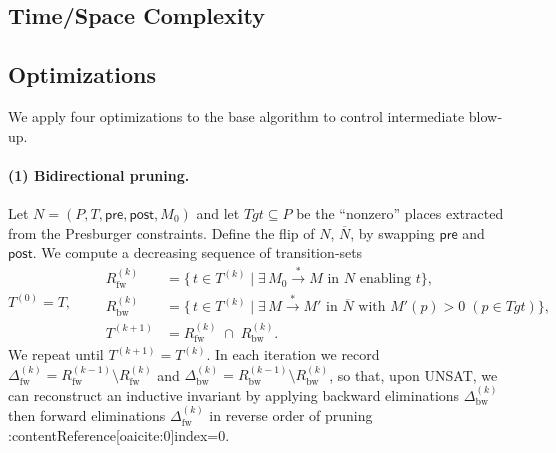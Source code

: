 %


\subsection{Time/Space Complexity}



\subsection{Optimizations}
\label{sec:optimizations}


We apply four optimizations to the base algorithm to control intermediate blow‐up.

\paragraph{(1) Bidirectional pruning.}  
Let \(N=(P,T,\mathsf{pre},\mathsf{post},M_0)\) and let \(\mathit{Tgt}\subseteq P\) be the “nonzero” places extracted from the Presburger constraints.  Define the flip of \(N\), \(\overline N\), by swapping \(\mathsf{pre}\) and \(\mathsf{post}\).  We compute a decreasing sequence of transition‐sets
\[
T^{(0)} = T,\qquad
\begin{aligned}
	R_{\mathrm{fw}}^{(k)} &= \{\,t\in T^{(k)} \mid \exists\,M_0\xrightarrow{*}M\text{ in }N\text{ enabling }t\},\\
	R_{\mathrm{bw}}^{(k)} &= \{\,t\in T^{(k)} \mid \exists\,M\xrightarrow{*}M'\text{ in }\overline N\text{ with }M'(p)>0\;(p\in\mathit{Tgt})\},\\
	T^{(k+1)} &= R_{\mathrm{fw}}^{(k)} \;\cap\; R_{\mathrm{bw}}^{(k)}.
\end{aligned}
\]
We repeat until \(T^{(k+1)}=T^{(k)}\).  In each iteration we record
\(\Delta_{\mathrm{fw}}^{(k)}=R_{\mathrm{fw}}^{(k-1)}\setminus R_{\mathrm{fw}}^{(k)}\)
and
\(\Delta_{\mathrm{bw}}^{(k)}=R_{\mathrm{bw}}^{(k-1)}\setminus R_{\mathrm{bw}}^{(k)}\),
so that, upon UNSAT, we can reconstruct an inductive invariant by applying
backward eliminations \(\Delta_{\mathrm{bw}}^{(k)}\) then forward eliminations \(\Delta_{\mathrm{fw}}^{(k)}\)
in reverse order of pruning :contentReference[oaicite:0]{index=0}.

